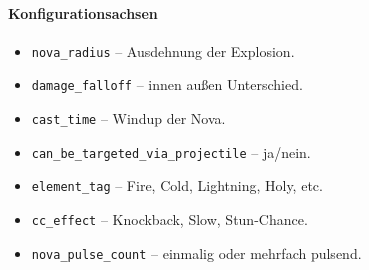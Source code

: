 \paragraph{Konfigurationsachsen}{}

\begin{itemize}
	\item \texttt{nova\_radius} – Ausdehnung der Explosion.
	\item \texttt{damage\_falloff} – innen außen Unterschied.
	\item \texttt{cast\_time} – Windup der Nova.
	\item \texttt{can\_be\_targeted\_via\_projectile} – ja/nein.
	\item \texttt{element\_tag} – Fire, Cold, Lightning, Holy, etc.
	\item \texttt{cc\_effect} – Knockback, Slow, Stun-Chance.
	\item \texttt{nova\_pulse\_count} – einmalig oder mehrfach pulsend.
\end{itemize}

